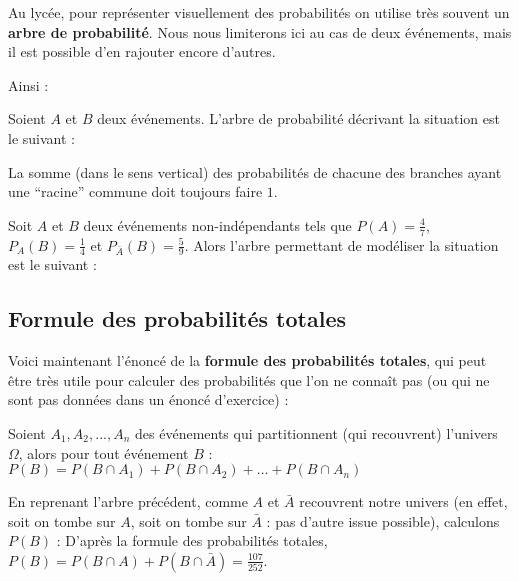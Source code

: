	Au lycée, pour représenter visuellement des probabilités on utilise très souvent un \textbf{arbre de probabilité}. Nous nous limiterons ici au cas de deux événements, mais il est possible d'en rajouter encore d'autres.
	
	Ainsi :
	
	\begin{formula}[Définition]
		Soient $A$ et $B$ deux événements. L'arbre de probabilité décrivant la situation est le suivant :
	\end{formula}
	
	La somme (dans le sens vertical) des probabilités de chacune des branches ayant une ``racine'' commune doit toujours faire $1$.
	
	\begin{tip}[Exemple]
		Soit $A$ et $B$ deux événements non-indépendants tels que $P(A) = \frac{4}{7}$, $P_{A}(B) = \frac{1}{4}$ et $P_{\bar{A}}(B) = \frac{5}{9}$.
		\newline
		Alors l'arbre permettant de modéliser la situation est le suivant :
	\end{tip}
	
	\subsection{Formule des probabilités totales}
	
	Voici maintenant l'énoncé de la \textbf{formule des probabilités totales}, qui peut être très utile pour calculer des probabilités que l'on ne connaît pas (ou qui ne sont pas données dans un énoncé d'exercice) :
	
	\begin{formula}
		Soient $A_1, A_2, ..., A_n$ des événements qui partitionnent (qui recouvrent) l'univers $\Omega$, alors pour tout événement $B$ :
		\newpar
		$P(B) = P(B \cap A_1) + P(B \cap A_2) + \dots + P(B \cap A_n)$
	\end{formula}
	
	\begin{tip}[Exemple]
		En reprenant l'arbre précédent, comme $A$ et $\bar{A}$ recouvrent notre univers (en effet, soit on tombe sur $A$, soit on tombe sur $\bar{A}$ : pas d'autre issue possible), calculons $P(B)$ :
		\newpar
		D'après la formule des probabilités totales, $P(B) = P(B \cap A) + P(B \cap \bar{A}) = \frac{107}{252}$.
	\end{tip}
	
